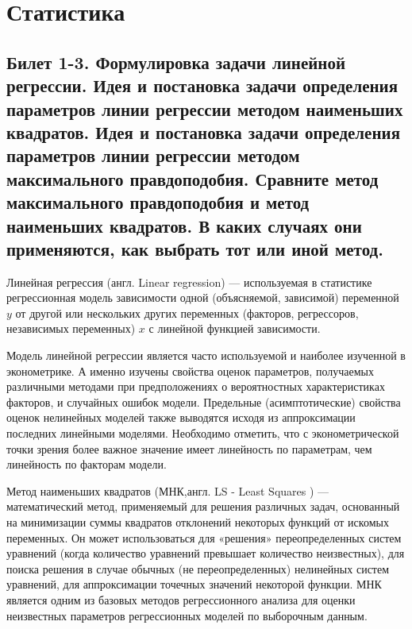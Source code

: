 \documentclass[a4paper, 12pt]{article}
\begin{document}
\section*{Статистика}
\subsection*{Билет 1-3. Формулировка задачи линейной регрессии. Идея и постановка задачи определения параметров линии регрессии методом наименьших квадратов. Идея и постановка задачи определения параметров линии регрессии методом максимального правдоподобия. Сравните метод максимального правдоподобия и метод наименьших квадратов. В каких случаях они применяются, как выбрать тот или иной метод.}
Линейная регрессия (англ. Linear regression) — используемая в статистике регрессионная модель зависимости одной (объясняемой, зависимой) переменной $y$ от другой или нескольких других переменных (факторов, регрессоров, независимых переменных) $x$ с линейной функцией зависимости.

Модель линейной регрессии является часто используемой и наиболее изученной в эконометрике. А именно изучены свойства оценок параметров, получаемых различными методами при предположениях о вероятностных характеристиках факторов, и случайных ошибок модели. Предельные (асимптотические) свойства оценок нелинейных моделей также выводятся исходя из аппроксимации последних линейными моделями. Необходимо отметить, что с эконометрической точки зрения более важное значение имеет линейность по параметрам, чем линейность по факторам модели.

Метод наименьших квадратов (МНК,англ. LS - Least Squares ) — математический метод, применяемый для решения различных задач, основанный на минимизации суммы квадратов отклонений некоторых функций от искомых переменных. Он может использоваться для «решения» переопределенных систем уравнений (когда количество уравнений превышает количество неизвестных), для поиска решения в случае обычных (не переопределенных) нелинейных систем уравнений, для аппроксимации точечных значений некоторой функции. МНК является одним из базовых методов регрессионного анализа для оценки неизвестных параметров регрессионных моделей по выборочным данным.
\end{document}
